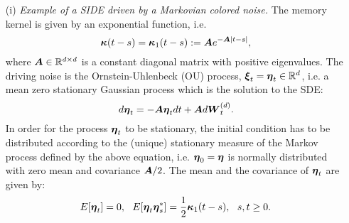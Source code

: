 \begin{itemize}
\item[(i)] {\it Example of a SIDE driven by a Markovian colored noise.}  The memory kernel is given by an exponential function, i.e. 
\begin{equation}
\boldsymbol{\kappa}(t-s) = \boldsymbol{\kappa}_{1}(t-s) := \boldsymbol{A} e^{-\boldsymbol{A}|t-s|},\end{equation} 
where $\boldsymbol{A} \in \mathbb{R}^{d \times d}$ is a constant diagonal matrix with positive eigenvalues.  The driving noise is  the Ornstein-Uhlenbeck (OU) process, $\boldsymbol{\xi}_{t} = \boldsymbol{\eta}_{t} \in \mathbb{R}^d$, i.e. a mean zero stationary Gaussian process which is the solution to the SDE: 
\begin{equation} \label{ou}
d\boldsymbol{\eta}_{t} = -\boldsymbol{A} \boldsymbol{\eta}_{t} dt + \boldsymbol{A} d\boldsymbol{W}^{(d)}_{t}.
\end{equation}
In order for the process $\boldsymbol{\eta}_{t}$ to be stationary, the initial condition has to be distributed according to the (unique) stationary measure of the Markov process defined by the above equation, i.e. $\boldsymbol{\eta}_{0} = \boldsymbol{\eta}$ is normally distributed with zero mean and covariance $\boldsymbol{A}/2$. The mean and the covariance of $\boldsymbol{\eta}_{t}$ are given by:
\begin{equation} \label{o-u_stats}
E[\boldsymbol{\eta}_{t}] = 0, \ \ E[\boldsymbol{\eta}_{t} \boldsymbol{\eta}_{s}^{*}] = \frac{1}{2}\boldsymbol{\kappa}_{1}(t-s), \ \ s,t \geq 0.
\end{equation}



\end{itemize}
